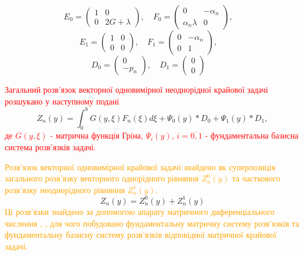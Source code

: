 \begin{equation*}
    E_0 = \begin{pmatrix}
        1 & 0 \\
        0 & 2G + \lambda
    \end{pmatrix}, \quad
    F_0 = \begin{pmatrix}
        0 & -\alpha_n \\
        \alpha_n \lambda & 0
    \end{pmatrix}, \quad
\end{equation*}
\begin{equation*}
    E_1 = \begin{pmatrix}
        1 & 0 \\
        0 & 0
    \end{pmatrix}, \quad
    F_1 = \begin{pmatrix}
        0 & -\alpha_n \\
        0 & 1
    \end{pmatrix}, \quad
\end{equation*}
\begin{equation*}
    D_0 = \begin{pmatrix}
        0 \\
        -p_n
    \end{pmatrix}, \quad
    D_1 = \begin{pmatrix}
        0 \\
        0
    \end{pmatrix} \quad
\end{equation*}

\textcolor{red}
{
Загальний розв'язок векторної одновимірної неоднорідної крайової задачі розшукано у наступному подані \cite{popov_2}
}
\begin{equation}\label{transf_gen_sol_gen}
    Z_n(y) = \int_0^b G(y,\xi) F_n(\xi) d\xi + \Psi_0(y) * D_0 + \Psi_1(y) * D_1,
\end{equation}
\textcolor{red}
{
де $G(y,\xi)$ - матрична функція Гріна, $\Psi_i(y)$, $i=\overline{0, 1}$ - фундаментальна базисна система розв'язків задачі.
}

\textcolor{orange}
{
Розв'язок векторної одновимірної крайової задачі знайдено як суперпозиція загального розв'язку векторного однорідного рівняння $Z_n^0(y)$
та часткового розв'язку неоднорідного рівняння $Z_n^1(y)$.
}
\begin{equation}
    Z_n(y) = Z_n^0(y) + Z_n^1(y)
\end{equation}
\textcolor{orange}
{
Ці розв'язки знайдено за допомогою апарату матричного диференціального числення \cite{popov_4}, \cite{gantmaher},
для чого побудовано фундаментальну матричну систему розв'язків та фундаментальну базисну систему розв'язків відповідної матричної крайової задачі.
}

